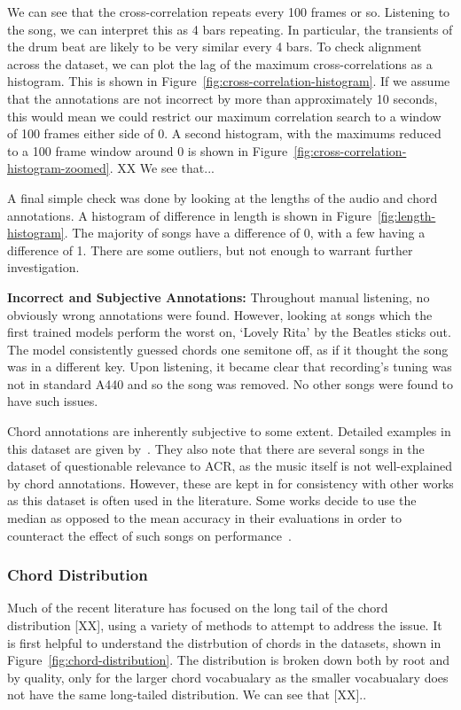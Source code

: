 We can see that the cross-correlation repeats every 100 frames or so. Listening to the song, we can interpret this as 4 bars repeating. In particular, the transients of the drum beat are likely to be very similar every 4 bars. To check alignment across the dataset, we can plot the lag of the maximum cross-correlations as a histogram. This is shown in Figure~\ref{fig:cross-correlation-histogram}. If we assume that the annotations are not incorrect by more than approximately 10 seconds, this would mean we could restrict our maximum correlation search to a window of 100 frames either side of 0. A second histogram, with the maximums reduced to a 100 frame window around 0 is shown in Figure~\ref{fig:cross-correlation-histogram-zoomed}. XX We see that...

A final simple check was done by looking at the lengths of the audio and chord annotations. A histogram of difference in length is shown in Figure~\ref{fig:length-histogram}. The majority of songs have a difference of 0, with a few having a difference of 1. There are some outliers, but not enough to warrant further investigation.

\textbf{Incorrect and Subjective Annotations:} Throughout manual listening, no obviously wrong annotations were found. However, looking at songs which the first trained models perform the worst on, `Lovely Rita' by the Beatles sticks out. The model consistently guessed chords one semitone off, as if it thought the song was in a different key. Upon listening, it became clear that recording's tuning was not in standard A440 and so the song was removed. No other songs were found to have such issues.

Chord annotations are inherently subjective to some extent. Detailed examples in this dataset are given by~\citet{FourTimelyInsights}. They also note that there are several songs in the dataset of questionable relevance to ACR, as the music itself is not well-explained by chord annotations. However, these are kept in for consistency with other works as this dataset is often used in the literature. Some works decide to use the median as opposed to the mean accuracy in their evaluations in order to counteract the effect of such songs on performance~\citep{StructuredTraining}.

\subsubsection{Chord Distribution}

Much of the recent literature has focused on the long tail of the chord distribution [XX], using a variety of methods to attempt to address the issue. It is first helpful to understand the distrbution of chords in the datasets, shown in Figure~\ref{fig:chord-distribution}. The distribution is broken down both by root and by quality, only for the larger chord vocabualary as the smaller vocabualary does not have the same long-tailed distribution. We can see that [XX]..


